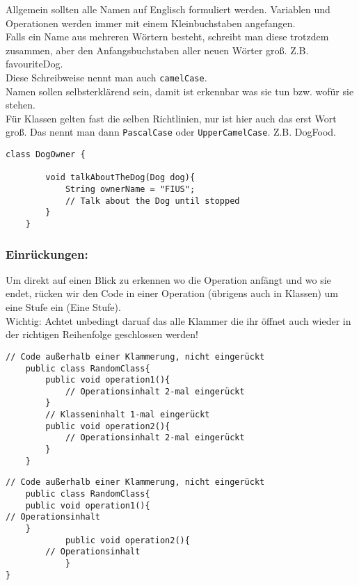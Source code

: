 \vspace{5mm}

\noindent
Allgemein sollten alle Namen auf Englisch formuliert werden.
Variablen und Operationen werden immer mit einem Kleinbuchstaben angefangen.\\

\noindent
Falls ein Name aus mehreren Wörtern besteht, schreibt man diese trotzdem zusammen, aber den Anfangsbuchstaben aller neuen Wörter groß. Z.B. favouriteDog.\\
Diese Schreibweise nennt man auch \lstinline{camelCase}.\\

\noindent
Namen sollen selbsterklärend sein, damit ist erkennbar was sie tun bzw. wofür sie stehen.\\

\noindent
Für Klassen gelten fast die selben Richtlinien, nur ist hier auch das erst Wort groß.
Das nennt man dann \lstinline{PascalCase} oder \lstinline{UpperCamelCase}. Z.B. DogFood.

\vspace{5mm}

\begin{lstlisting}[title=\textbf{Beispiel gute Namensgebung}]
	class DogOwner {

		void talkAboutTheDog(Dog dog){
			String ownerName = "FIUS";
			// Talk about the Dog until stopped
		}
	}
\end{lstlisting}

\subsubsection*{Einrückungen:}
Um direkt auf einen Blick zu erkennen wo die Operation anfängt und wo sie endet, rücken wir den Code in einer Operation (übrigens auch in Klassen) um eine Stufe ein (Eine  Stufe).\\

\noindent
{\color{red} Wichtig: }Achtet unbedingt daruaf das alle Klammer die ihr öffnet auch wieder in der richtigen Reihenfolge geschlossen werden!

\newpage

\begin{lstlisting}[title=\textbf{Beispiel gute Namensgebung}]
	// Code außerhalb einer Klammerung, nicht eingerückt
	public class RandomClass{
		public void operation1(){
			// Operationsinhalt 2-mal eingerückt
		}
		// Klasseninhalt 1-mal eingerückt
		public void operation2(){
			// Operationsinhalt 2-mal eingerückt
		}
	}
\end{lstlisting}

\begin{lstlisting}[title=\textbf{Beispiel schlechte Einrückung}]
	// Code außerhalb einer Klammerung, nicht eingerückt
	public class RandomClass{
	public void operation1(){
// Operationsinhalt
	}
			public void operation2(){
		// Operationsinhalt
			}
}
\end{lstlisting}

